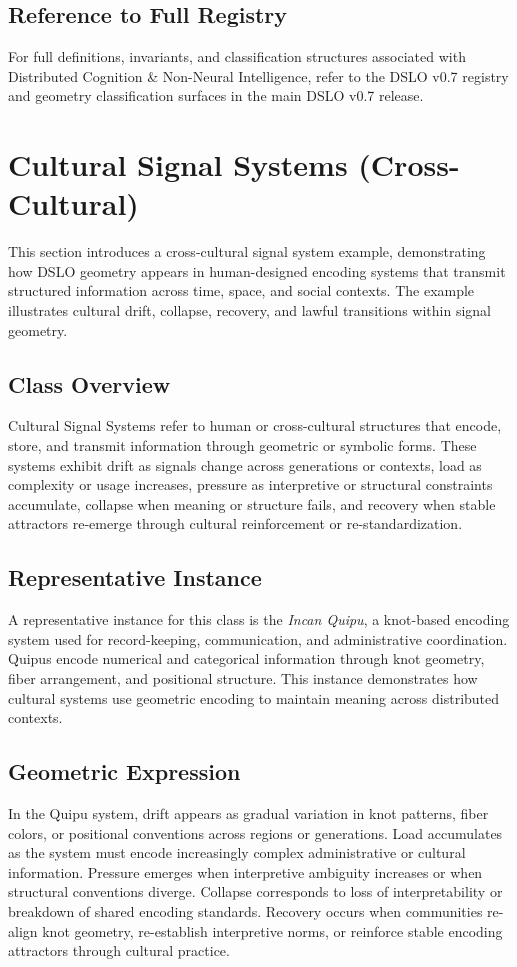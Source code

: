 \subsection{Reference to Full Registry}
For full definitions, invariants, and classification structures associated with Distributed Cognition 
\& Non-Neural Intelligence, refer to the DSLO v0.7 registry and geometry classification surfaces in 
the main DSLO v0.7 release.

\section{Cultural Signal Systems (Cross-Cultural)}
\label{sec:cultural-signal-systems}

This section introduces a cross-cultural signal system example, demonstrating how DSLO geometry appears 
in human-designed encoding systems that transmit structured information across time, space, and social 
contexts. The example illustrates cultural drift, collapse, recovery, and lawful transitions within 
signal geometry.

\subsection{Class Overview}
Cultural Signal Systems refer to human or cross-cultural structures that encode, store, and transmit 
information through geometric or symbolic forms. These systems exhibit drift as signals change across 
generations or contexts, load as complexity or usage increases, pressure as interpretive or structural 
constraints accumulate, collapse when meaning or structure fails, and recovery when stable attractors 
re-emerge through cultural reinforcement or re-standardization.

\subsection{Representative Instance}
A representative instance for this class is the \emph{Incan Quipu}, a knot-based encoding system used 
for record-keeping, communication, and administrative coordination. Quipus encode numerical and 
categorical information through knot geometry, fiber arrangement, and positional structure. This 
instance demonstrates how cultural systems use geometric encoding to maintain meaning across distributed 
contexts.

\subsection{Geometric Expression}
In the Quipu system, drift appears as gradual variation in knot patterns, fiber colors, or positional 
conventions across regions or generations. Load accumulates as the system must encode increasingly 
complex administrative or cultural information. Pressure emerges when interpretive ambiguity increases 
or when structural conventions diverge. Collapse corresponds to loss of interpretability or breakdown 
of shared encoding standards. Recovery occurs when communities re-align knot geometry, re-establish 
interpretive norms, or reinforce stable encoding attractors through cultural practice.

